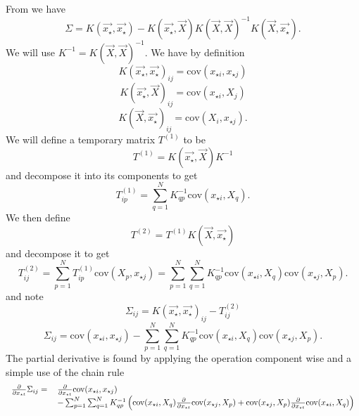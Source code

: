 \documentclass[phd,tocprelim]{cornell}
\begin{document}
From \cite{RW} we have
\begin{equation}
 \Sigma = K(\vec{x_{\star}}, \vec{x_{\star}}) - K(\vec{x_{\star}}, \vec{X}) K(\vec{X}, \vec{X})^{-1} K(\vec{X}, \vec{x_{\star}}).
\end{equation}
We will use $K^{-1} = K(\vec{X}, \vec{X})^{-1}$. We have by definition
\begin{equation}
 K(\vec{x_{\star}}, \vec{x_{\star}})_{ij} = \mbox{cov}(x_{\star i}, x_{\star j})
\end{equation}
\begin{equation}
 K(\vec{x_{\star}}, \vec{X})_{ij} = \mbox{cov}(x_{\star i}, X_{j})
\end{equation}
\begin{equation}
 K(\vec{X}, \vec{x_{\star}})_{ij} = \mbox{cov}(X_{i}, x_{\star j}).
\end{equation}
We will define a temporary matrix $T^{(1)}$ to be
\begin{equation}
 T^{(1)} = K(\vec{x_{\star}}, \vec{X}) K^{-1}
\end{equation}
and decompose it into its components to get
\begin{equation}
 T^{(1)}_{ip} = \sum_{q = 1}^{N} K^{-1}_{qp} \mbox{cov}(x_{\star i}, X_{q}).
\end{equation}
We then define
\begin{equation}
 T^{(2)} = T^{(1)} K(\vec{X}, \vec{x_{\star}})
\end{equation}
and decompose it to get
\begin{equation}
 T^{(2)}_{ij} = \sum_{p = 1}^{N} T^{(1)}_{ip} \mbox{cov}(X_{p}, x_{\star j}) = \sum_{p = 1}^{N} \sum_{q = 1}^{N} K^{-1}_{qp} \mbox{cov}(x_{\star i}, X_{q}) \mbox{cov}(x_{\star j}, X_{p}).
\end{equation}
and note
\begin{equation}
 \Sigma_{ij} = K(\vec{x_{\star}}, \vec{x_{\star}})_{ij} - T^{(2)}_{ij}
\end{equation}
\begin{equation}
 \Sigma_{ij} = \mbox{cov}(x_{\star i}, x_{\star j}) - \sum_{p = 1}^{N} \sum_{q = 1}^{N} K^{-1}_{qp} \mbox{cov}(x_{\star i}, X_{q}) \mbox{cov}(x_{\star j}, X_{p}).
\end{equation}
The partial derivative is found by applying the operation component wise and a simple use of the chain rule
\begin{equation}
 \begin{tabular}{rl}
 $\frac{\partial}{\partial x_{\star t}} \Sigma_{ij} =$ & $\frac{\partial}{\partial x_{\star t}} \mbox{cov}(x_{\star i}, x_{\star j})$ \\
 & $- \sum_{p = 1}^{N} \sum_{q = 1}^{N} K^{-1}_{qp} \left( \mbox{cov}(x_{\star i}, X_{q}) \frac{\partial}{\partial x_{\star t}} \mbox{cov}(x_{\star j}, X_{p}) + \mbox{cov}(x_{\star j}, X_{p}) \frac{\partial}{\partial x_{\star t}} \mbox{cov}(x_{\star i}, X_{q}) \right)$
 \end{tabular}
\end{equation}
\end{document}
